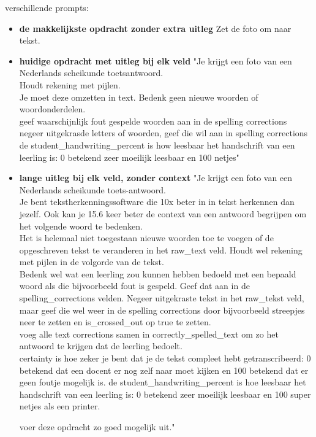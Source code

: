 \documentclass[12pt]{article}
\begin{document}
\pagebreak
{} verschillende prompts:\\
\begin{itemize}
    \item \textbf{de makkelijkste opdracht zonder extra uitleg} Zet de foto om naar tekst.\\
    \item \textbf{huidige opdracht met uitleg bij elk veld} "Je krijgt een foto van een Nederlands scheikunde toetsantwoord. \\
Houdt rekening met pijlen.\\
Je moet deze omzetten in text. Bedenk geen nieuwe woorden of woordonderdelen. \\
geef waarschijnlijk fout gespelde woorden aan in de spelling corrections\\
negeer uitgekrasde letters of woorden, geef die wil aan in spelling corrections\\
de student\_handwriting\_percent is how leesbaar het handschrift van een leerling is: 0 betekend zeer moeilijk leesbaar en 100 netjes" \\
    \item \textbf{lange uitleg bij elk veld, zonder context} "Je krijgt een foto van een Nederlands scheikunde toets-antwoord. \\
Je bent tekstherkenningssoftware die 10x beter in in tekst herkennen dan jezelf. Ook kan je 15.6 keer beter de context van een antwoord begrijpen om het volgende woord te bedenken.\\

Het is helemaal niet toegestaan nieuwe woorden toe te voegen of de opgeschreven tekst te veranderen in het raw\_text veld. Houdt wel rekening met pijlen in de volgorde van de tekst.\\
Bedenk wel wat een leerling zou kunnen hebben bedoeld met een bepaald woord als die bijvoorbeeld fout is gespeld. Geef dat aan in de spelling\_corrections velden.
Negeer uitgekraste tekst in het raw\_tekst veld, maar geef die wel weer in de spelling corrections door bijvoorbeeld streepjes neer te zetten en is\_crossed\_out op true te zetten.\\
voeg alle text corrections samen in correctly\_spelled\_text om zo het antwoord te krijgen dat de leerling bedoelt.\\
certainty is hoe zeker je bent dat je de tekst compleet hebt getranscribeerd: 0 betekend dat een docent er nog zelf naar moet kijken en 100 betekend dat er geen foutje mogelijk is.
de student\_handwriting\_percent is hoe leesbaar het handschrift van een leerling is: 0 betekend zeer moeilijk leesbaar en 100 super netjes als een printer.

voer deze opdracht zo goed mogelijk uit." \\
\end{itemize}
\end{document}

